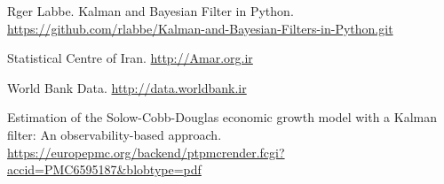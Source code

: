 \documentclass[11pt, fleqn]{article}
\begin{document}

\newhline
\begin{LTR}
\begin{thebibliography}{99}

Rger Labbe. Kalman and Bayesian Filter in Python. \url{https://github.com/rlabbe/Kalman-and-Bayesian-Filters-in-Python.git}

  Statistical Centre of Iran. \url{http://Amar.org.ir}

World Bank Data. \url{http://data.worldbank.ir}

Estimation of the Solow-Cobb-Douglas economic growth model with a
Kalman filter: An observability-based approach. \url{https://europepmc.org/backend/ptpmcrender.fcgi?accid=PMC6595187&blobtype=pdf}
\end{thebibliography}
\end{LTR}
\end{document}
